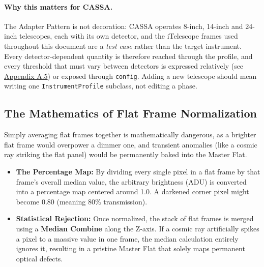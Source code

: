 \documentclass[11pt,a4paper]{article}
\begin{document}
\paragraph{Why this matters for CASSA.} The Adapter Pattern is not decoration: CASSA operates 8-inch, 14-inch and 24-inch telescopes, each with its own detector, and the iTelescope frames used throughout this document are a \emph{test case} rather than the target instrument. Every detector-dependent quantity is therefore reached through the profile, and every threshold that must vary between detectors is expressed relatively (see \hyperref[app:bpm]{Appendix A.5}) or exposed through \texttt{config}. Adding a new telescope should mean writing one \texttt{InstrumentProfile} subclass, not editing a phase.

\subsection{The Mathematics of Flat Frame Normalization}\label{app:flat}
Simply averaging flat frames together is mathematically dangerous, as a brighter flat frame would overpower a dimmer one, and transient anomalies (like a cosmic ray striking the flat panel) would be permanently baked into the Master Flat.
\begin{itemize}[leftmargin=*]
    \item \textbf{The Percentage Map:} By dividing every single pixel in a flat frame by that frame's overall median value, the arbitrary brightness (ADU) is converted into a percentage map centered around 1.0. A darkened corner pixel might become 0.80 (meaning 80\% transmission).
    \item \textbf{Statistical Rejection:} Once normalized, the stack of flat frames is merged using a \textbf{Median Combine} along the Z-axis. If a cosmic ray artificially spikes a pixel to a massive value in one frame, the median calculation entirely ignores it, resulting in a pristine Master Flat that solely maps permanent optical defects.
\end{itemize}
\end{document}
